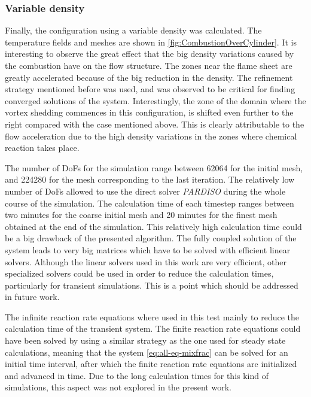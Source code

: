 \FloatBarrier
\subsubsection{Variable density}
Finally, the configuration using a variable density was calculated. The temperature fields and meshes are shown in \cref{fig:CombustionOverCylinder}. It is interesting to observe the great effect that the big density variations caused by the combustion have on the flow structure. The zones near the flame sheet are greatly accelerated because of the big reduction in the density. The refinement strategy mentioned before was used, and was observed to be critical for finding converged solutions of the system.  Interestingly, the zone of the domain where the vortex shedding commences in this configuration, is shifted even further to the right compared with the case mentioned above. This is clearly attributable to the flow acceleration due to the high density variations in the zones where chemical reaction takes place.  

The number of DoFs for the simulation range between 62064 for the initial mesh, and 224280 for the mesh corresponding to the last iteration. The relatively low number of DoFs allowed to use the direct solver \textit{PARDISO} during the whole course of the simulation. The calculation time of each timestep ranges between two minutes for the coarse initial mesh and 20 minutes for the finest mesh obtained at the end of the simulation. This relatively high calculation time could be a big drawback of the presented algorithm. The fully coupled solution of the system leads to very big matrices which have to be solved with efficient linear solvers. Although the linear solvers used in this work are very efficient, other specialized solvers could be used in order to reduce the calculation times, particularly for transient simulations.  This is a point which should be addressed in future work. 

The infinite reaction rate equations where used in this test mainly to reduce the calculation time of the transient system. The finite reaction rate equations could have been solved by using a similar strategy as the one used for steady state calculations, meaning that the system \cref{eq:all-eq-mixfrac} can be solved for an initial time interval, after which the finite reaction rate equations are initialized and advanced in time. 
Due to the long calculation times for this kind of simulations, this aspect was not explored in the present work.



